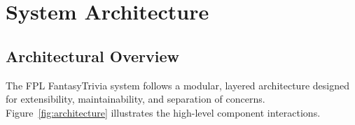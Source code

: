 \documentclass[11pt, a4paper]{article}
\begin{document}
\section{System Architecture}
\label{sec:architecture}

\subsection{Architectural Overview}
The FPL FantasyTrivia system follows a modular, layered architecture designed for extensibility, maintainability, and separation of concerns. Figure~\ref{fig:architecture} illustrates the high-level component interactions.
\end{document}
